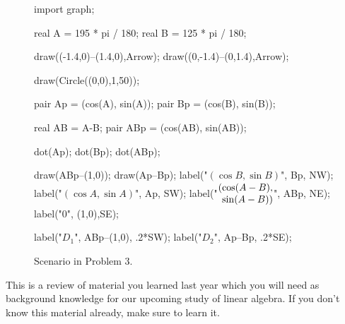 \documentclass[../gatm.tex]{subfiles}
\begin{document}
\begin{figure}[h]
	\begin{center}
		\begin{minipage}[b]{\textwidth}
			\centering
			\begin{asy}[width=0.5\textwidth]
				import graph;
				
				real A = 195 * pi / 180;
				real B = 125 * pi / 180;
				
				draw((-1.4,0)--(1.4,0),Arrow);
				draw((0,-1.4)--(0,1.4),Arrow);
				
				draw(Circle((0,0),1,50));
				
				pair Ap = (cos(A), sin(A));
				pair Bp = (cos(B), sin(B));
				
				real AB = A-B;
				pair ABp = (cos(AB), sin(AB));
				
				dot(Ap);
				dot(Bp);
				dot(ABp);
				
				draw(ABp--(1,0));
				draw(Ap--Bp);
				label("$(\cos B, \sin B)$", Bp, NW);
				label("$(\cos A, \sin A)$", Ap, SW);
				label("$\arraycolsep=0pt \begin{array}{rl} (& \cos (A-B), \\ & \sin (A-B)) \end{array}$", ABp, NE);
				label("$0$", (1,0),SE);
				
				label("$D_1$", ABp--(1,0), .2*SW);
				label("$D_2$", Ap--Bp, .2*SE);
				
			\end{asy}
		\end{minipage}
	\end{center}
	\vspace*{-2\baselineskip}
	\begin{center}
		\begin{minipage}[t]{\textwidth}
			\caption{Scenario in Problem 3.}
			\label{fig:unit_circle}
		\end{minipage}\hfill
	\end{center}
	\vspace*{-2\baselineskip}
\end{figure}

\noindent This is a review of material you learned last year which you will need as background knowledge for our upcoming study of linear algebra. If you don't know this material already, make sure to learn it.
\end{document}
